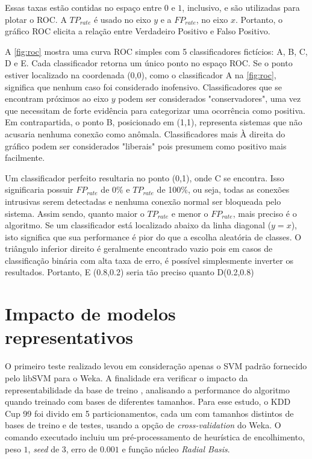 Essas taxas estão contidas no espaço entre $0$ e $1$, inclusivo, e são utilizadas para plotar o ROC. A $TP_{rate}$ é
usado no eixo $y$ e a $FP_{rate}$, no eixo $x$. Portanto, o gráfico ROC elicita a relação entre Verdadeiro Positivo e
Falso Positivo.
\par A \ref{fig:roc} mostra uma curva ROC simples com 5 classificadores fictícios: A, B, C, D e E. Cada classificador
retorna um único ponto no espaço ROC. Se o ponto estiver localizado na coordenada (0,0), como o classificador A na
\ref{fig:roc}, significa que nenhum caso foi considerado inofensivo. Classificadores que se encontram próximos ao eixo
$y$ podem ser considerados "conservadores", uma vez que necessitam de forte evidência para categorizar uma ocorrência
como positiva. Em contrapartida, o ponto B, posicionado em (1,1), representa sistemas que não acusaria nenhuma
conexão como anômala. Classificadores mais À direita do gráfico podem ser considerados "liberais" pois presumem como
positivo mais facilmente.
\par Um classificador perfeito resultaria no ponto (0,1), onde C se encontra. Isso significaria possuir $FP_{rate}$ de
0\% e $TP_{rate}$ de 100\%, ou seja, todas as conexões intrusivas serem detectadas e nenhuma conexão normal ser
bloqueada pelo sistema. Assim sendo, quanto maior o $TP_{rate}$ e menor o $FP_{rate}$, mais preciso é o algoritmo.
 Se um classificador está localizado abaixo da linha diagonal ($y = x$), isto significa que sua performance é pior do
 que a escolha aleatória de classes. O triângulo inferior direito é geralmente encontrado vazio pois em casos de
 classificação binária com alta taxa de erro, é possível simplesmente inverter os resultados. Portanto, E (0.8,0.2)
 seria tão preciso quanto D(0.2,0.8)


\section{Impacto de modelos representativos}
O primeiro teste realizado levou em consideração apenas o SVM padrão fornecido pelo libSVM para o Weka. A finalidade
era verificar o impacto da representabilidade da base de treino \cite{yaman11}, analisando a performance do algoritmo
quando treinado com bases de diferentes tamanhos. Para esse estudo, o KDD Cup 99 foi divido em 5 particionamentos,
cada um com tamanhos distintos de bases de treino e de testes, usando a opção de \textit{cross-validation} do Weka.
O comando executado incluiu um pré-processamento de heurística de encolhimento, peso $1$, \emph{seed} de $3$, erro de
$0.001$ e função núcleo \textit{Radial Basis}.

